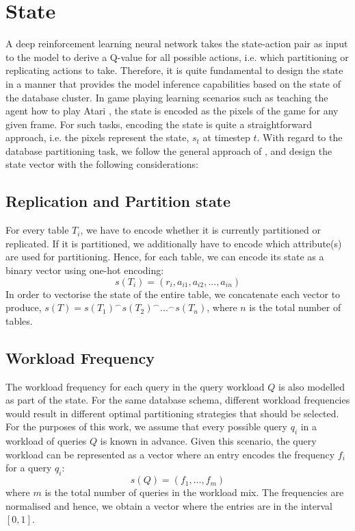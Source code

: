 \section{State}
A deep reinforcement learning neural network takes the state-action pair as input to the model to derive a Q-value for all possible actions, i.e. which partitioning or replicating actions to take. Therefore, it is quite fundamental to design the state in a manner that provides the model inference capabilities based on the state of the database cluster. In game playing learning scenarios such as teaching the agent how to play Atari \cite{DBLP:journals/corr/MnihKSGAWR13}, the state is encoded as the pixels of the game for any given frame. For such tasks, encoding the state is quite a straightforward approach, i.e. the pixels represent the state, $s_t$ at timestep $t$. With regard to the database partitioning task, we follow the general approach of \citeauthor{Hilprecht:2019:TLP:3329859.3329876}, and design the state vector with the following considerations:


\subsection{Replication and Partition state}
For every table $T_i$, we have to encode whether it is currently partitioned or replicated. If it is partitioned, we additionally have to encode which attribute(s) are used for partitioning. Hence, for each table, we can encode its state as a binary vector using one-hot encoding:
\begin{equation}
    s(T_i) = (r_i, a_{i1},a_{i2},...,a_{in})
\end{equation}
In order to vectorise the state of the entire table, we concatenate each vector to produce, $s(T) = s(T_1)^\frown s(T_2)^\frown ...^\frown s(T_n)$, where $n$ is the total number of tables.

\subsection{Workload Frequency}
The workload frequency for each query in the query workload $Q$ is also modelled as part of the state. For the same database schema, different workload frequencies would result in different optimal partitioning strategies that should be selected. For the purposes of this work, we assume that every possible query $q_i$ in a workload of queries $Q$ is known in advance. Given this scenario, the query workload can be represented as a vector where an entry encodes the frequency $f_i$ for a query $q_i$:
\begin{equation}
\label{eq:workload-frequency}
    s(Q) = (f_1,...,f_m)
\end{equation}
where $m$ is the total number of queries in the workload mix. The frequencies are normalised and hence, we obtain a vector where the entries are in the interval $[0,1]$. 

